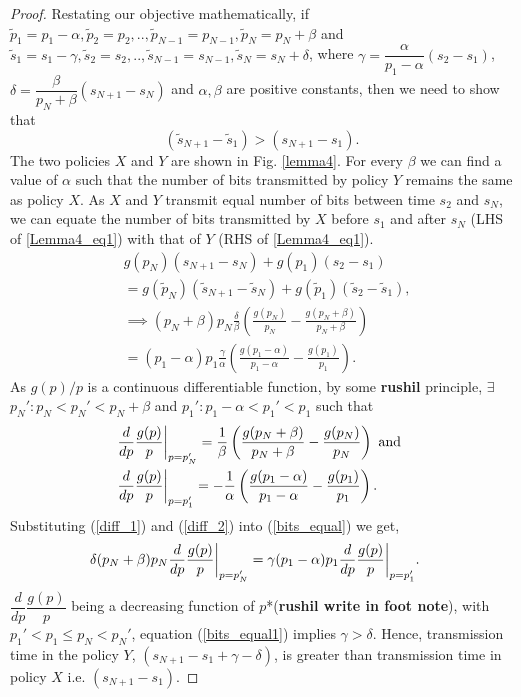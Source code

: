 \begin{proof}
Restating our objective mathematically, if $\widetilde{p}_1=p_1-\alpha,\widetilde{p}_2=p_2,..,\widetilde{p}_{N-1}=p_{N-1},\widetilde{p}_N=p_N+\beta $ and $\widetilde{s}_1=s_1-\gamma,\widetilde{s}_2=s_2,..,\widetilde{s}_{N-1}=s_{N-1},\widetilde{s}_N=s_N+\delta $, where $\gamma=\dfrac{\alpha}{p_1-\alpha}(s_2-s_1)$, $\delta =\dfrac{\beta}{p_N+\beta}(s_{N+1}-s_N)$ and $\alpha ,\beta$ are positive constants, then we need to show that
\begin{equation}
(\widetilde{s}_{N+1}-\widetilde{s}_1)>(s_{N+1}-s_1).
\end{equation}
The two policies $X$  and $Y$ are shown in Fig. \ref{lemma4}. For every $\beta$ we can find a value of $\alpha$ such that the number of bits transmitted by policy $Y$ remains the same as policy $X$. As $X$ and $Y$ transmit equal number of bits between time $s_2$ and $s_N$, we can equate the number of bits transmitted by $X$ before $s_1$ and after $s_{N}$ (LHS of \eqref{Lemma4_eq1}) with that of $Y$ (RHS of \eqref{Lemma4_eq1}).
\begin{align}
&g(p_N)(s_{N+1}-s_N)+g(p_1)(s_2-s_1)\nonumber
\\
&=g(\widetilde{p}_N)(\widetilde{s}_{N+1}-\widetilde{s}_N)+g(\widetilde{p}_1)(\widetilde{s}_2-\widetilde{s}_1)\label{Lemma4_eq1},
\\
&\implies (p_N+\beta)p_N\frac{\delta}{\beta}\left(\frac{g(p_N)}{p_N}-\frac{g(p_N+\beta)}{p_N+\beta}\right)\nonumber
\\
&=(p_1-\alpha)p_1\frac{\gamma}{\alpha}\left(\frac{g(p_1-\alpha)}{p_1-\alpha}-\frac{g(p_1)}{p_1}\right).\label{bits_equal}
\end{align}
As $g(p)/p$ is a continuous differentiable function, by some \textbf{rushil} principle, $\exists$ $p_N':p_N<p_N'<p_{N}+\beta$ and $p_1':p_1-\alpha<p_1'<p_{1}$ such that
\begin{align}
&\frac{d}{dp} \frac{g(p)}{p} \bigg{\vert}_{p=p_N'}=\frac{1}{\beta}\left(\frac{g(p_N+\beta)}{p_N+\beta}-\frac{g(p_N)}{p_N}\right)\text{ and }\label{diff_1}
\\
&\frac{d}{dp} \frac{g(p)}{p}\bigg{\vert}_{p=p_1'}=-\frac{1}{\alpha}\left(\frac{g(p_1-\alpha)}{p_1-\alpha}-\frac{g(p_1)}{p_1}\right)\label{diff_2}.
\end{align}
Substituting (\ref{diff_1}) and (\ref{diff_2}) into (\ref{bits_equal}) we get,
\begin{align}
&\delta(p_N+\beta)p_N\frac{d}{dp} \frac{g(p)}{p}  \bigg{\vert}_{p=p_N'}
=\gamma(p_1-\alpha)p_1\frac{d}{dp} \frac{g(p)}{p} \bigg{\vert}_{p=p_1'}.\label{bits_equal1}
\end{align}
$\dfrac{d}{dp} \dfrac{g(p)}{p}$ being a decreasing function of $p$*(\textbf{rushil write in foot note}), with $p_1'<p_1\le p_N<p_N'$, equation (\ref{bits_equal1}) implies $\gamma >\delta$. Hence, transmission time in the policy $Y$, $\left( s_{N+1}-s_1+\gamma-\delta\right)$, is greater than transmission time in policy $X$ i.e. $(s_{N+1}-s_1)$.
\end{proof}
